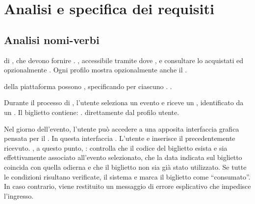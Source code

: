 
\chapter{Analisi e specifica dei requisiti}
\section{Analisi nomi-verbi}


 di , che devono fornire . , accessibile tramite  dove , e consultare lo  acquistati ed opzionalmente . Ogni profilo mostra opzionalmente anche il .

 della piattaforma possono , specificando per ciascuno .   .

Durante il processo di , l’utente seleziona un evento e riceve un , identificato da un . Il biglietto contiene: .  direttamente dal profilo utente.

Nel giorno dell’evento, l’utente pu\`{o} accedere a una apposita interfaccia grafica pensata per il . In questa interfaccia . L’utente  e inserisce il  precedentemente ricevuto. , a questo punto, : controlla che il codice del biglietto esista e sia effettivamente associato all’evento selezionato, che la data indicata sul biglietto coincida con quella odierna e che il biglietto non sia gi\`{a} stato utilizzato. Se tutte le condizioni risultano verificate, il sistema  e marca il biglietto come “consumato”. In caso contrario, viene restituito un messaggio di errore esplicativo che impedisce l’ingresso.

